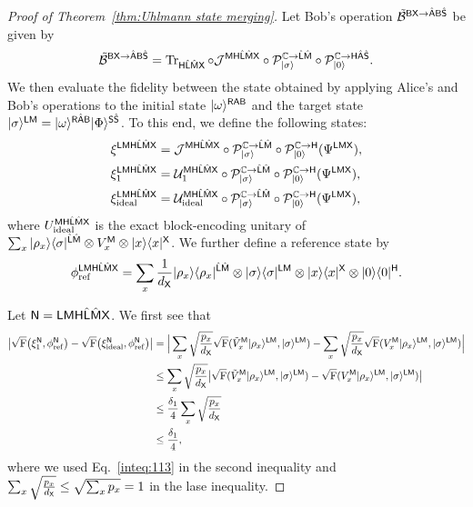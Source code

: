 \begin{proof}[Proof of Theorem~\ref{thm:Uhlmann state merging}]
Let Bob's operation $\til{\cB}^{\sB\sX\rarr\hat{\sA}\sB\hat{\sS}}$ be given by  
\begin{align}
    \til{\cB}^{\sB\sX\rarr\hat{\sA}\sB\hat{\sS}} = \tr_{\sH\hat{\sL}\hat{\sM}\sX}\circ\cJ^{\sM\sH\hat{\sL}\hat{\sM}\sX}\circ\cP_{\ket{\sigma}}^{\bC\rarr\hat{\sL}\hat{\sM}}\circ\cP_{\ket{0}}^{\bC\rarr\sH\hat{\sA}\hat{\sS}}.
\end{align}
We then evaluate the fidelity between the state obtained by applying Alice's and Bob's operations to the initial state $\ket{\omega}^{\sR\sA\sB}$ and the target state $\ket{\sigma}^{\sL\sM} = \ket{\omega}^{\sR\hat{\sA}\sB}\ket{\Phi}^{\sS\hat{\sS}}$.
To this end, we define the following states:
\begin{align}
    &\xi^{\sL\sM\sH\hat{\sL}\hat{\sM}\sX} = \cJ^{\sM\sH\hat{\sL}\hat{\sM}\sX}\circ\cP_{\ket{\sigma}}^{\bC\rarr\hat{\sL}\hat{\sM}}\circ\cP_{\ket{0}}^{\bC\rarr\sH} (\Psi^{\sL\sM\sX}), \\
    &\xi_1^{\sL\sM\sH\hat{\sL}\hat{\sM}\sX} = \cU_1^{\sM\sH\hat{\sL}\hat{\sM}\sX}\circ\cP_{\ket{\sigma}}^{\bC\rarr\hat{\sL}\hat{\sM}}\circ\cP_{\ket{0}}^{\bC\rarr\sH} (\Psi^{\sL\sM\sX}), \\
    &\xi_{\rm ideal}^{\sL\sM\sH\hat{\sL}\hat{\sM}\sX} = \cU_{\rm ideal}^{\sM\sH\hat{\sL}\hat{\sM}\sX}\circ\cP_{\ket{\sigma}}^{\bC\rarr\hat{\sL}\hat{\sM}}\circ\cP_{\ket{0}}^{\bC\rarr\sH} (\Psi^{\sL\sM\sX}),
\end{align}
where $U_{\rm ideal}^{\sM\sH\hat{\sL}\hat{\sM}\sX}$ is the exact block-encoding unitary of $\sum_x \ketbra{\rho_x}{\sigma}^{\hat{\sL}\hat{\sM}}\otimes V_x^\sM \otimes\ketbra{x}{x}^\sX$.
We further define a reference state by
\begin{align}
    \phi_{\rm ref}^{\sL\sM\sH\hat{\sL}\hat{\sM}\sX} = \sum_x \f{1}{d_\sX}\ketbra{\rho_x}{\rho_x}^{\hat{\sL}\hat{\sM}} \otimes \ketbra{\sigma}{\sigma}^{\sL\sM} \otimes \ketbra{x}{x}^\sX \otimes \ketbra{0}{0}^\sH.
\end{align}

Let $\sN = \sL\sM\sH\hat{\sL}\hat{\sM}\sX$.
We first see that
\begin{align}
    \big|\sqrt{\rF}\big(\xi_1^\sN, \phi_{\rm ref}^\sN\big) - \sqrt{\rF}\big(\xi_{\rm ideal}^\sN, \phi_{\rm ref}^\sN\big)\big| 
    &= \Big|\sum_x\sqrt{\f{p_x}{d_\sX}}\sqrt{\rF}(\til{V}_x^\sM\ket{\rho_x}^{\sL\sM}, \ket{\sigma}^{\sL\sM}) - \sum_x\sqrt{\f{p_x}{d_\sX}}\sqrt{\rF}(V_x^\sM\ket{\rho_x}^{\sL\sM}, \ket{\sigma}^{\sL\sM})\Big| \\
    &\leq \sum_x\sqrt{\f{p_x}{d_\sX}}\big|\sqrt{\rF}(\til{V}_x^\sM\ket{\rho_x}^{\sL\sM}, \ket{\sigma}^{\sL\sM}) - \sqrt{\rF}(V_x^\sM\ket{\rho_x}^{\sL\sM}, \ket{\sigma}^{\sL\sM})\big| \\
    &\leq \f{\delta_1}{4}\sum_x\sqrt{\f{p_x}{d_\sX}} \\
    \label{inteq:114}
    &\leq \f{\delta_1}{4},
\end{align}
where we used Eq.~\eqref{inteq:113} in the second inequality and $\sum_x\sqrt{\f{p_x}{d_\sX}} \leq \sqrt{\sum_x p_x} = 1$ in the lase inequality.


\end{proof}
